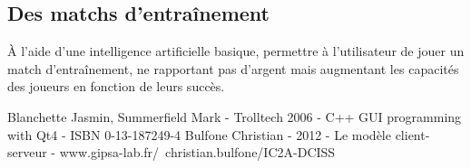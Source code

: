 \documentclass[a4paper,titlepage]{scrreprt}
\begin{document}
  \subsection{Des matchs d’entraînement}
    À l'aide d'une intelligence artificielle basique, permettre à l'utilisateur
    de jouer un match d'entraînement, ne rapportant pas d'argent mais
    augmentant les capacités des joueurs en fonction de leurs succès.
    
  


\begin{thebibliography}{9}
 Blanchette Jasmin, Summerfield Mark - Trolltech 2006 - C++ GUI programming with Qt4 - ISBN 0-13-187249-4
 Bulfone Christian - 2012 - Le modèle client-serveur - www.gipsa-lab.fr/~christian.bulfone/IC2A-DCISS
\end{thebibliography}
\printindex
\end{document}
